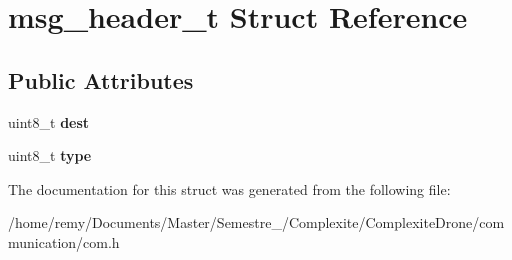 \hypertarget{structmsg__header__t}{}\section{msg\+\_\+header\+\_\+t Struct Reference}
\label{structmsg__header__t}
\subsection*{Public Attributes}
\begin{DoxyCompactItemize}
\item 
uint8\+\_\+t {\bfseries dest}\hypertarget{structmsg__header__t_acab3fa558cabfbbbd2acfc7eaa63be5e}{}\label{structmsg__header__t_acab3fa558cabfbbbd2acfc7eaa63be5e}

\item 
uint8\+\_\+t {\bfseries type}\hypertarget{structmsg__header__t_a34487cefd9552b3cc491dd911b131e5a}{}\label{structmsg__header__t_a34487cefd9552b3cc491dd911b131e5a}

\end{DoxyCompactItemize}


The documentation for this struct was generated from the following file\+:\begin{DoxyCompactItemize}
\item 
/home/remy/\+Documents/\+Master/\+Semestre\+\_/\+Complexite/\+Complexite\+Drone/communication/com.\+h\end{DoxyCompactItemize}
